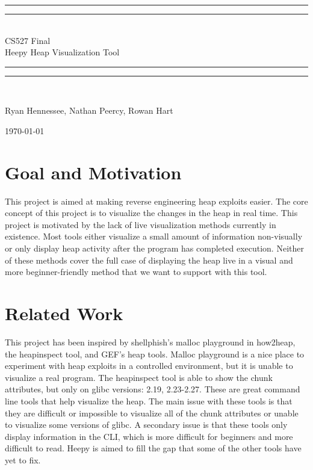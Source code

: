 \documentclass[12pt]{article}
\newlength{\drop}
\begin{document}
\begin{titlepage}
	\textheight
	\centering
	\vspace*{\baselineskip}
	\rule{\textwidth}{1.6pt}\vspace*{-\baselineskip}\vspace*{2pt}
	\rule{\textwidth}{0.4pt}\\[\baselineskip]
	{\LARGE CS527 Final \\[0.3\baselineskip] Heepy Heap Visualization Tool}\\[0.2\baselineskip]
	\rule{\textwidth}{0.4pt}\vspace*{-\baselineskip}\vspace{3.2pt}
	\rule{\textwidth}{1.6pt}\\[\baselineskip]
	\scshape
	\vspace*{2\baselineskip}
	{\Large Ryan Hennessee, Nathan Peercy, Rowan Hart\par}
	\vspace*{2\baselineskip}
	{\scshape \today} \\
	\vfill
\end{titlepage}

\section{Goal and Motivation}

\hspace{\parindent} This project is aimed at making reverse engineering heap exploits easier. The core concept of this project is to visualize the changes in the heap in real time. This project is motivated by the lack of live visualization methods currently in existence. Most tools either visualize a small amount of information non-visually or only display heap activity after the program has completed execution. Neither of these methods cover the full case of displaying the heap live in a visual and more beginner-friendly method that we want to support with this tool. \\

\section{Related Work}

\hspace{\parindent} This project has been inspired by shellphish’s malloc playground in how2heap, the heapinspect tool, and GEF’s heap tools. Malloc playground is a nice place to experiment with heap exploits in a controlled environment, but it is unable to visualize a real program. The heapinspect tool is able to show the chunk attributes, but only on glibc versions: 2.19, 2.23-2.27. These are great command line tools that help visualize the heap. The main issue with these tools is that they are difficult or impossible to visualize all of the chunk attributes or unable to visualize some versions of glibc. A secondary issue is that these tools only display information in the CLI, which is more difficult for beginners and more difficult to read. Heepy is aimed to fill the gap that some of the other tools have yet to fix.  \\
\end{document}
